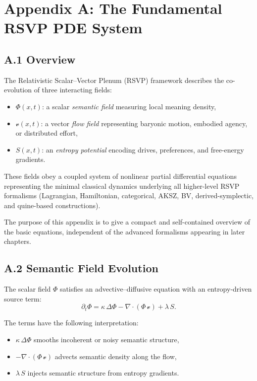 \chapter*{Appendix A: The Fundamental RSVP PDE System}

\section*{A.1 \; Overview}

The Relativistic Scalar--Vector Plenum (RSVP) framework describes the
co-evolution of three interacting fields:
\begin{itemize}
  \item $\Phi(x,t)$: a scalar \emph{semantic field} measuring local meaning density,
  \item $\mathcal{v}(x,t)$: a vector \emph{flow field} representing baryonic motion,
        embodied agency, or distributed effort,
  \item $S(x,t)$: an \emph{entropy potential} encoding drives, preferences, and
        free-energy gradients.
\end{itemize}

These fields obey a coupled system of nonlinear partial differential equations
representing the minimal classical dynamics underlying all higher-level
RSVP formalisms (Lagrangian, Hamiltonian, categorical, AKSZ, BV,
derived-symplectic, and quine-based constructions).

The purpose of this appendix is to give a compact and self-contained overview
of the basic equations, independent of the advanced formalisms appearing in later
chapters.

\section*{A.2 \; Semantic Field Evolution}

The scalar field $\Phi$ satisfies an advective--diffusive equation with an
entropy-driven source term:
\begin{equation}
\label{eq:RSVP-Phi}
\partial_t \Phi
  = \kappa\,\Delta\Phi
    - \nabla\!\cdot(\Phi\,\mathcal{v})
    + \lambda\,S.
\end{equation}

The terms have the following interpretation:
\begin{itemize}
  \item $\kappa\,\Delta\Phi$ smooths incoherent or noisy semantic structure,
  \item $-\nabla\!\cdot(\Phi\,\mathcal{v})$ advects semantic density along the flow,
  \item $\lambda\,S$ injects semantic structure from entropy gradients.
\end{itemize}

